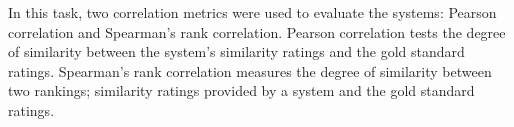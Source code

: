 \documentclass[11pt]{article}
\begin{document}
\begin{table}[hr]
\begin{center}
\end{center}
\caption{\label{table:results-s2p-train} Sentence2phrase subtask scores for the training data.}
\end{table}


In this task, two correlation metrics were used to evaluate the systems: Pearson correlation and Spearman's rank correlation.  Pearson correlation tests the degree of similarity between the system's similarity ratings and the gold standard ratings. Spearman's rank correlation measures the degree of similarity between two rankings; similarity ratings provided by a system and the gold standard
ratings.
\end{document}
